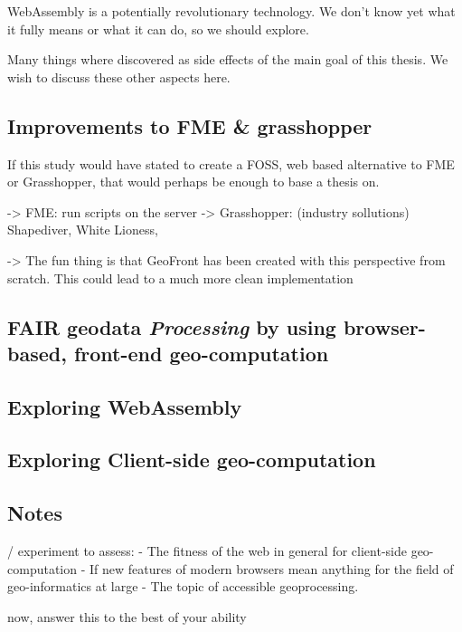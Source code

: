 WebAssembly is a potentially revolutionary technology. We don't know yet what it fully means or what it can do, so we should explore.


Many things where discovered as side effects of the main goal of this thesis. We wish to discuss these other aspects here.

\subsection{Improvements to FME \& grasshopper}
If this study would have stated to create a FOSS, web based alternative to FME or Grasshopper, that would perhaps be enough to base a thesis on.

-> FME: run scripts on the server 
-> Grasshopper: (industry sollutions) Shapediver, White Lioness, 

-> The fun thing is that GeoFront has been created with this perspective from scratch. This could lead to a much more clean implementation

\subsection{FAIR geodata \emph{Processing} by using browser-based, front-end geo-computation}



\subsection{Exploring WebAssembly}

\subsection{Exploring Client-side geo-computation}


\subsection{Notes}


/ experiment to assess: 
- The fitness of the web in general for client-side geo-computation
- If new features of modern browsers mean anything for the field of geo-informatics at large 
- The topic of accessible geoprocessing.

now, answer this to the best of your ability


